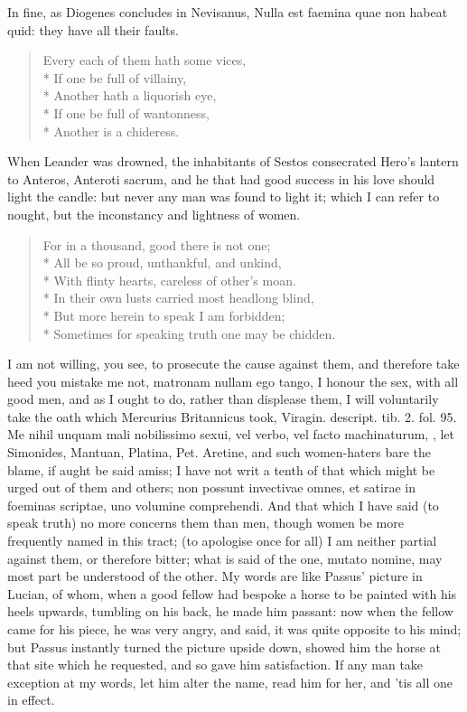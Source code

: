 {In fine, as Diogenes concludes in Nevisanus, Nulla est faemina quae non
habeat quid: they have all their faults.
%
{\gothfont
\begin{verse}
Every each of them hath some vices,\\*
If one be full of villainy,\\*
Another hath a liquorish eye,\\*
If one be full of wantonness,\\*
Another is a chideress.
\end{verse}
}
%
When Leander was drowned, the inhabitants of Sestos consecrated Hero's
lantern to Anteros, Anteroti sacrum, and he that had good success
in his love should light the candle: but never any man was found to
light it; which I can refer to nought, but the inconstancy and
lightness of women.
%
\begin{verse}
For in a thousand, good there is not one;\\*
All be so proud, unthankful, and unkind,\\*
With flinty hearts, careless of other's moan.\\*
In their own lusts carried most headlong blind,\\*
But more herein to speak I am forbidden;\\*
Sometimes for speaking truth one may be chidden.
\end{verse}
%
I am not willing, you see, to prosecute the cause against them, and
therefore take heed you mistake me not, matronam nullam ego
tango, I honour the sex, with all good men, and as I ought to do,
rather than displease them, I will voluntarily take the oath which
Mercurius Britannicus took, Viragin. descript. tib. 2. fol. 95. Me
nihil unquam mali nobilissimo sexui, vel verbo, vel facto machinaturum,
\etc{}, let Simonides, Mantuan, Platina, Pet. Aretine, and such
women-haters bare the blame, if aught be said amiss; I have not writ a
tenth of that which might be urged out of them and others; non
possunt invectivae omnes, et satirae in foeminas scriptae, uno volumine
comprehendi. And that which I have said (to speak truth) no more
concerns them than men, though women be more frequently named in this
tract; (to apologise once for all) I am neither partial against them,
or therefore bitter; what is said of the one, mutato nomine, may most
part be understood of the other. My words are like Passus' picture in
Lucian, of whom, when a good fellow had bespoke a horse to be
painted with his heels upwards, tumbling on his back, he made him
passant: now when the fellow came for his piece, he was very angry, and
said, it was quite opposite to his mind; but Passus instantly turned
the picture upside down, showed him the horse at that site which he
requested, and so gave him satisfaction. If any man take exception at
my words, let him alter the name, read him for her, and 'tis all one in
effect.

}
